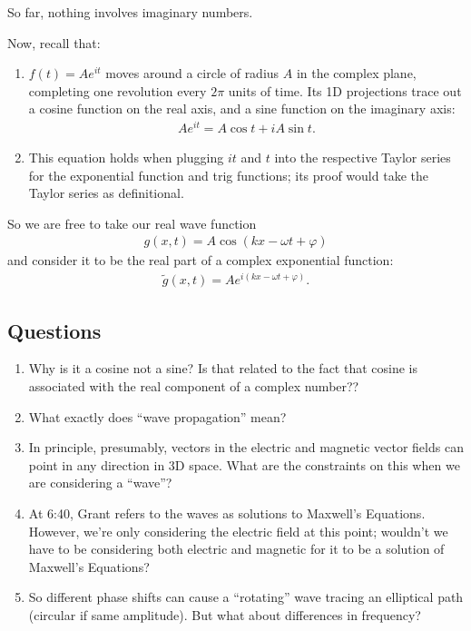 So far, nothing involves imaginary numbers.

Now, recall that:
\begin{enumerate}
\item $f(t) = Ae^{it}$ moves around a circle of radius $A$ in the complex plane, completing one
  revolution every $2\pi$ units of time. Its 1D projections trace out a cosine function on the real
  axis, and a sine function on the imaginary axis:
  \begin{align*}
    Ae^{it} = A\cos t + iA\sin t.
  \end{align*}
\item This equation holds when plugging $it$ and $t$ into the respective Taylor series for the
  exponential function and trig functions; its proof would take the Taylor series as definitional.
\end{enumerate}

So we are free to take our real wave function
\begin{align*}
  g(x, t) = A\cos(kx - \omega t + \varphi)
\end{align*}
and consider it to be the real part of a complex exponential function:
\begin{align*}
  \tilde g(x, t) = Ae^{i(kx - \omega t + \varphi)}.
\end{align*}


\newpage
\subsection*{Questions}
\begin{enumerate}
\item Why is it a cosine not a sine? Is that related to the fact that cosine is associated with the
  real component of a complex number??
\item What exactly does ``wave propagation'' mean?
\item In principle, presumably, vectors in the electric and magnetic vector fields can point in any
  direction in 3D space. What are the constraints on this when we are considering a ``wave''?
\item At 6:40, Grant refers to the waves as solutions to Maxwell's Equations. However, we're only
  considering the electric field at this point; wouldn't we have to be considering both electric and
  magnetic for it to be a solution of Maxwell's Equations?
\item So different phase shifts can cause a ``rotating'' wave tracing an elliptical path (circular
  if same amplitude). But what about differences in frequency?
\end{enumerate}

